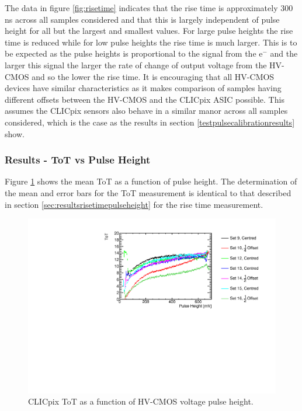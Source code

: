 The data in figure \ref{fig:risetime} indicates that the rise time is approximately 300 ns across all samples considered and that this is largely independent of pulse height for all but the largest and smallest values.  For large pulse heights the rise time is reduced while for low pulse heights the rise time is much larger.  This is to be expected as the pulse heights is proportional to the signal from the $\text{e}^{-}$ and the larger this signal the larger the rate of change of output voltage from the HV-CMOS and so the lower the rise time.  It is encouraging that all HV-CMOS devices have similar characteristics as it makes comparison of samples having different offsets between the HV-CMOS and the CLICpix ASIC possible.  This assumes the CLICpix sensors also behave in a similar manor across all samples considered, which is the case as the results in section \ref{testpulsecalibrationresults} show.  


\subsubsection{Results -  ToT vs Pulse Height}
\label{sec:totvspulseheight}
Figure \ref{fig:tot} shows the mean ToT as a function of pulse height.  The determination of the mean and error bars for the ToT measurement is identical to that described in section \ref{sec:resultsrisetimepulseheight} for the rise time measurement. 

\begin{figure}
\centering
\includegraphics[width=1.0\textwidth]{CLICdpVertex/Plots/RadSourceAnalysis/AllSETs_TargetTot_PulseHeight.pdf}
\caption[CLICpix ToT as a function of HV-CMOS voltage pulse height.]{CLICpix ToT as a function of HV-CMOS voltage pulse height.}
\label{fig:tot}
\end{figure}

